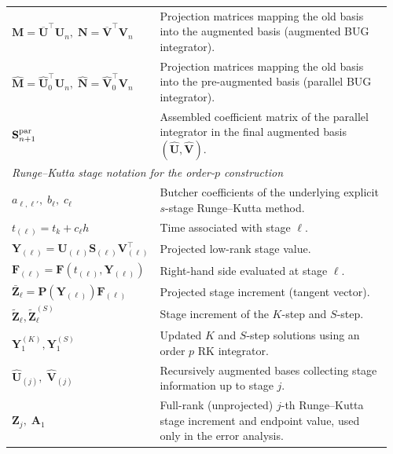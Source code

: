 \documentclass[preprint,runningheads]{svjour3}
\def\wh{\widehat}
\newcommand\bfA{{\mathbf A}}
\newcommand\bfF{{\mathbf F}}
\newcommand\bfM{{\mathbf M}}
\newcommand\bfN{{\mathbf N}}
\newcommand\bfP{{\mathbf P}}
\newcommand\bfS{{\mathbf S}}
\newcommand\bfU{{\mathbf U}}
\newcommand\bfV{{\mathbf V}}
\newcommand\bfY{{\mathbf Y}}
\newcommand\bfZ{{\mathbf Z}}
\begin{document}
\begin{longtable}{p{0.33\linewidth} p{0.63\linewidth}}
$\bfM=\overline\bfU^\top\bfU_n,\;\bfN=\overline\bfV^\top\bfV_n$
& Projection matrices mapping the old basis into the augmented basis (augmented BUG integrator). \\

$\wh \bfM=\wh\bfU_0^\top\bfU_n,\;\wh \bfN=\wh\bfV_0^\top\bfV_n$
& Projection matrices mapping the old basis into the pre-augmented basis (parallel BUG integrator). \\

$\bfS_{n+1}^{\rm par}$
& Assembled coefficient matrix of the parallel integrator in the final augmented basis $(\wh\bfU,\wh\bfV)$. \\

\hline
\multicolumn{2}{l}{\textit{Runge--Kutta stage notation for the order-$p$ construction}}\\
\hline
$a_{\ell,\ell'},\;b_\ell,\;c_\ell$
& Butcher coefficients of the underlying explicit $s$-stage Runge--Kutta method. \\

$t_{(\ell)}=t_k+c_\ell h$
& Time associated with stage $\ell$. \\

$\bfY_{(\ell)}=\bfU_{(\ell)}\bfS_{(\ell)}\bfV_{(\ell)}^\top$
& Projected low-rank stage value. \\

$\bfF_{(\ell)}=\bfF(t_{(\ell)},\bfY_{(\ell)})$
& Right-hand side evaluated at stage $\ell$. \\

$\bar{\bfZ}_\ell=\bfP(\bfY_{(\ell)})\bfF_{(\ell)}$
& Projected stage increment (tangent vector). \\

$\widetilde \bfZ_{\ell}, \widetilde \bfZ_{\ell}^{(S)}$
& Stage increment of the $K$-step and $S$-step. \\

$\bfY_1^{(K)}, \bfY_1^{(S)}$
& Updated $K$ and $S$-step solutions using an order $p$ RK integrator. \\

$\wh\bfU_{(j)},\;\wh\bfV_{(j)}$
& Recursively augmented bases collecting stage information up to stage $j$. \\

$\bfZ_j,\;\bfA_1$
& Full-rank (unprojected) $j$-th Runge--Kutta stage increment and endpoint value, used only in the error analysis. \\

\end{longtable}
\end{document}
